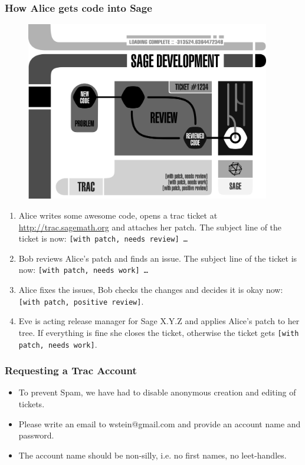 \documentclass[11pt,blackandwhite]{beamer}
\begin{document}
\begin{frame}[allowframebreaks]
\frametitle{How Alice gets code into Sage}

 \begin{figure}
 \centering
 \includegraphics[width=0.95\textwidth]{sage-development.png}
\end{figure}

\framebreak

\begin{enumerate}
 \item Alice writes some awesome code, opens a trac ticket at
\url{http://trac.sagemath.org} and attaches her patch. The subject line of the
ticket is now: \texttt{[with patch, needs review] \dots}
 \item Bob reviews Alice's patch and finds an issue. The subject line
of the ticket is now: \texttt{[with patch, needs work] \dots}
\item Alice fixes the issues, Bob checks the changes and decides it is okay
now: \texttt{[with patch, positive review]}.
\item Eve is acting release manager for Sage X.Y.Z and applies Alice's
patch to her tree. If everything is fine she closes the ticket, otherwise the
ticket gets \texttt{[with patch, needs work]}.
\end{enumerate}

\end{frame}



\begin{frame}
\frametitle{Requesting a Trac Account}
\begin{itemize}
\item To prevent Spam, we have had to disable anonymous creation and
editing of tickets.
\item  Please write an email to wstein@gmail.com and provide an
account name and password. 
\item The account name should be non-silly, i.e. no first names, no
leet-handles.
\end{itemize}
\end{frame}
\end{document}
